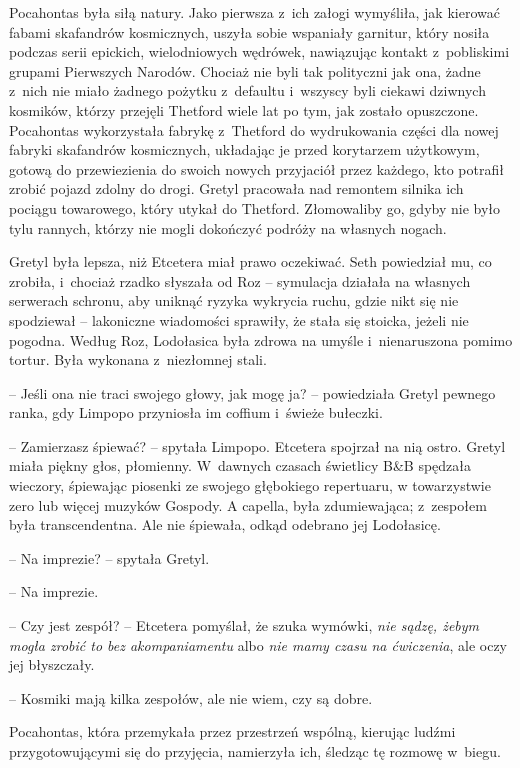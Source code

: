 \documentclass[oneside,polish,11pt,sfheadings]{mwbk}
\begin{document}
Pocahontas była siłą natury. Jako pierwsza z~ich załogi wymyśliła, jak
kierować fabami skafandrów kosmicznych, uszyła sobie wspaniały garnitur,
który nosiła podczas serii epickich, wielodniowych wędrówek, nawiązując
kontakt z~pobliskimi grupami Pierwszych Narodów. Chociaż nie byli tak
polityczni jak ona, żadne z~nich nie miało żadnego pożytku z~defaultu i~wszyscy byli ciekawi dziwnych kosmików, którzy przejęli Thetford wiele
lat po tym, jak zostało opuszczone. Pocahontas wykorzystała fabrykę z~Thetford do wydrukowania części dla nowej fabryki skafandrów
kosmicznych, układając je przed korytarzem użytkowym, gotową do
przewiezienia do swoich nowych przyjaciół przez każdego, kto potrafił
zrobić pojazd zdolny do drogi. Gretyl pracowała nad remontem silnika ich
pociągu towarowego, który utykał do Thetford. Złomowaliby go, gdyby nie
było tylu rannych, którzy nie mogli dokończyć podróży na własnych
nogach.

Gretyl była lepsza, niż Etcetera miał prawo oczekiwać. Seth powiedział
mu, co zrobiła, i~chociaż rzadko słyszała od Roz -- symulacja działała na
własnych serwerach schronu, aby uniknąć ryzyka wykrycia ruchu, gdzie
nikt się nie spodziewał -- lakoniczne wiadomości sprawiły, że stała się
stoicka, jeżeli nie pogodna. Według Roz, Lodołasica była zdrowa na
umyśle i~nienaruszona pomimo tortur. Była wykonana z~niezłomnej stali. 

-- Jeśli ona nie traci swojego głowy, jak mogę ja? -- powiedziała Gretyl
pewnego ranka, gdy Limpopo przyniosła im coffium i~świeże bułeczki.

-- Zamierzasz śpiewać? -- spytała Limpopo. Etcetera spojrzał na nią ostro.
Gretyl miała piękny głos, płomienny. W~dawnych czasach świetlicy B\&B
spędzała wieczory, śpiewając piosenki ze swojego głębokiego repertuaru,
w towarzystwie zero lub więcej muzyków Gospody. A capella, była
zdumiewająca; z~zespołem była transcendentna. Ale nie śpiewała, odkąd
odebrano jej Lodołasicę.

-- Na imprezie? -- spytała Gretyl.

-- Na imprezie.

-- Czy jest zespół? -- Etcetera pomyślał, że szuka wymówki, \textit{nie
sądzę, żebym mogła zrobić to bez akompaniamentu} albo \textit{nie mamy
czasu na ćwiczenia}, ale oczy jej błyszczały.

-- Kosmiki mają kilka zespołów, ale nie wiem, czy są dobre.

Pocahontas, która przemykała przez przestrzeń wspólną, kierując ludźmi
przygotowującymi się do przyjęcia, namierzyła ich, śledząc tę rozmowę w~biegu.
\end{document}
